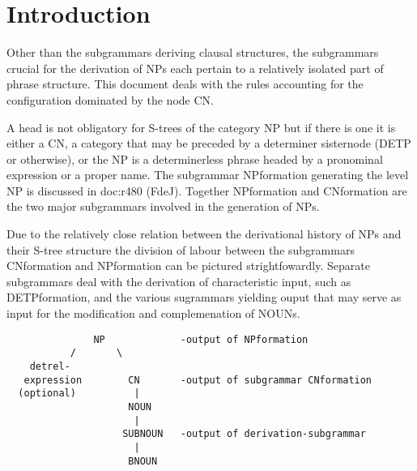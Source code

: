 


   \RosSupersedes{}
   \MakeRosTitle
\def\ra{$\rightarrow$ }
%
%



\section{Introduction}

Other than the subgrammars deriving clausal structures, 
the subgrammars crucial for the derivation of NPs
each pertain to a relatively isolated part of phrase structure.
This document deals with the rules accounting for the 
configuration dominated by the node CN.


A head is not obligatory for S-trees of the category NP 
but if there is one it is either a CN, a category that may be preceded by 
a determiner sisternode (DETP or otherwise), or the NP is a determinerless 
phrase headed by a pronominal expression or a proper name. 
The subgrammar NPformation generating the level NP is discussed in 
doc:r480 (FdeJ).
Together NPformation and CNformation
are the two major subgrammars involved in the generation of NPs.

Due to the relatively close relation between the derivational 
history of NPs and their S-tree structure
the division of labour between the subgrammars CNformation and NPformation 
can be pictured strightfowardly. Separate subgrammars deal with the derivation of 
characteristic input, such as DETPformation, and the various sugrammars yielding
ouput that may serve as input for the modification and complemenation of 
NOUNs.\\


\begin{verbatim}
               NP             -output of NPformation
           /       \
    detrel-
   expression        CN       -output of subgrammar CNformation
  (optional)          |
                     NOUN
                      |
                    SUBNOUN   -output of derivation-subgrammar
                      |
                     BNOUN
\end{verbatim}


